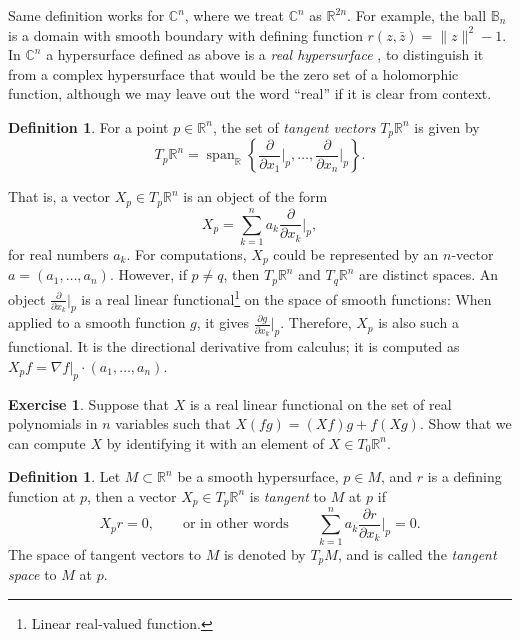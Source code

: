 \documentclass[12pt,openany]{book}
\newcommand{\snorm}[1]{\lVert {#1} \rVert}
\newcommand{\C}{{\mathbb{C}}}
\newcommand{\R}{{\mathbb{R}}}
\newcommand{\bB}{{\mathbb{B}}}
\newcommand{\myindex}[1]{#1\index{#1}}
\theoremstyle{plain}
\theoremstyle{remark}
\theoremstyle{definition}
\newtheorem{defn}[thm]{Definition}
\newenvironment{exbox}{%
    \def\FrameCommand{\vrule width 1pt \relax\hspace{10pt}}%
    \MakeFramed{\advance\hsize-\width\FrameRestore}%
}{%
    \endMakeFramed
}
\theoremstyle{exercise}
\newtheorem{exercise}{Exercise}[section]
\theoremstyle{example}
\begin{document}
Same definition works for $\C^n$, where we treat $\C^n$ as $\R^{2n}$.
For example, the ball $\bB_n$ is a domain with smooth boundary with defining
function $r(z,\bar{z}) = \snorm{z}^2-1$.
In $\C^n$
a hypersurface defined as above is a \emph{\myindex{real hypersurface}}%
,
to distinguish it from a complex hypersurface that would be the zero set of
a holomorphic function, although we may leave out the word ``real''
if it is clear from context.

\begin{defn}
For a point $p \in \R^n$, the set of \emph{tangent vectors} $T_p \R^n$ is given by
%
\begin{equation*}
T_p \R^n = \operatorname{span}_{\R} \left\{
\frac{\partial}{\partial x_1}\Big|_p,
\ldots,
\frac{\partial}{\partial x_n}\Big|_p \right\} .
\end{equation*}
\end{defn}

That is, a vector $X_p \in T_p \R^n$ is an object of the form
\begin{equation*}
X_p = \sum_{k=1}^n a_k
\frac{\partial}{\partial x_k}\Big|_p ,
\end{equation*}
for real numbers $a_k$.  For computations, $X_p$ could be represented
by an $n$-vector $a = (a_1,\ldots,a_n)$.  However, if $p \not= q$, then
$T_p \R^n$ and
$T_q \R^n$ are distinct spaces.
%
An object
$\frac{\partial}{\partial x_k}\big|_p$
is a real linear functional\footnote{Linear real-valued function.}
on the space of smooth functions:
When applied to a smooth function $g$, it gives
$\frac{\partial g}{\partial x_k} \big|_p$.  Therefore, $X_p$ is also such a
functional.  It is the directional derivative from calculus;
it is computed as $X_p f = \nabla f|_p \cdot (a_1,\ldots,a_n)$.

\begin{exbox}
\begin{exercise}
Suppose that $X$ is a real linear functional on the set of real
polynomials in $n$ variables
such that $X (fg) = (Xf) g + f (Xg)$.  Show that we can compute $X$
by identifying it with an element of $X \in T_0 \R^n$.
\end{exercise}
\end{exbox}


\begin{defn}
Let $M \subset \R^n$ be a smooth hypersurface,
$p \in M$, and $r$ is a defining function at $p$,
then a vector $X_p \in T_p \R^n$ is \emph{tangent}
to $M$ at $p$ if
\begin{equation*}
X_p r = 0, \qquad \text{or in other words} \qquad
\sum_{k=1}^n a_k \frac{\partial r}{\partial x_k} \Big|_p = 0 .
\end{equation*}
%
The space of tangent vectors to $M$ is denoted by $T_p M$, and
is called the \emph{\myindex{tangent space}} to $M$ at $p$.
\end{defn}
\end{document}
